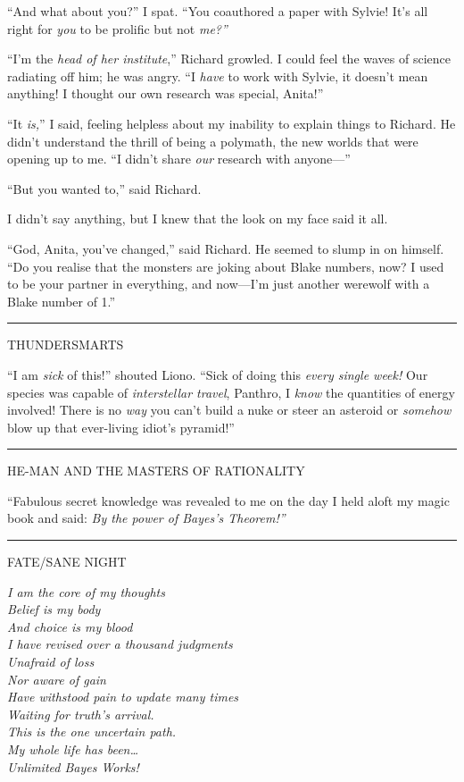 ``And what about you?'' I spat. ``You coauthored a paper with Sylvie!
It's all right for \emph{you} to be prolific but not \emph{me?''}

``I'm the \emph{head of her institute},'' Richard growled. I could feel
the waves of science radiating off him; he was angry. ``I \emph{have} to
work with Sylvie, it doesn't mean anything! I thought our own research
was special, Anita!''

``It \emph{is,}'' I said, feeling helpless about my inability to explain
things to Richard. He didn't understand the thrill of being a polymath,
the new worlds that were opening up to me. ``I didn't share \emph{our}
research with anyone---''

``But you wanted to,'' said Richard.

I didn't say anything, but I knew that the look on my face said it all.

``God, Anita, you've changed,'' said Richard. He seemed to slump in on
himself. ``Do you realise that the monsters are joking about Blake
numbers, now? I used to be your partner in everything, and now---I'm
just another werewolf with a Blake number of 1.''

\begin{center}\rule{3in}{0.4pt}\end{center}

THUNDERSMARTS

``I am \emph{sick} of this!'' shouted Liono. ``Sick of doing this
\emph{every single week!} Our species was capable of \emph{interstellar
travel}, Panthro, I \emph{know} the quantities of energy involved! There
is no \emph{way} you can't build a nuke or steer an asteroid or
\emph{somehow} blow up that ever-living idiot's pyramid!''

\begin{center}\rule{3in}{0.4pt}\end{center}

HE-MAN AND THE MASTERS OF RATIONALITY

``Fabulous secret knowledge was revealed to me on the day I held aloft
my magic book and said: \emph{By the power of Bayes's Theorem!''}

\begin{center}\rule{3in}{0.4pt}\end{center}

FATE/SANE NIGHT

\emph{I am the core of my thoughts}\\\emph{Belief is my body}\\\emph{And
choice is my blood}\\\emph{I have revised over a thousand
judgments}\\\emph{Unafraid of loss}\\\emph{Nor aware of
gain}\\\emph{Have withstood pain to update many times}\\\emph{Waiting
for truth's arrival.}\\\emph{This is the one uncertain path.}\\\emph{My
whole life has been\ldots{}}\\\emph{Unlimited Bayes Works!}

